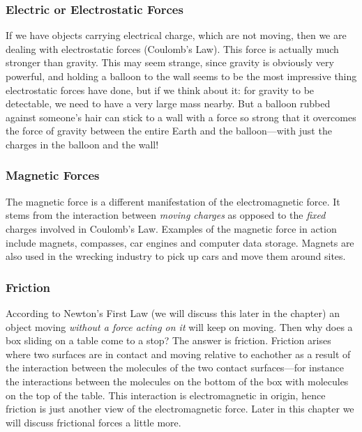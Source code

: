 \subsubsection{Electric or Electrostatic Forces}
If we have objects carrying electrical charge, which are not moving, then we are dealing with electrostatic forces (Coulomb's Law). This force is actually much stronger than gravity. This may seem strange, since gravity is obviously very powerful, and holding a balloon to the wall seems to be the most impressive thing electrostatic forces have done, but if we think about it: for gravity to be detectable, we need to have a very large mass nearby. But a balloon rubbed against someone's hair can stick to a wall with a force so strong that it overcomes the force of gravity between the entire Earth and the balloon---with just the charges in the balloon and the wall!

\subsubsection{Magnetic Forces}
The magnetic force is a different manifestation of the electromagnetic force. It stems from the interaction between \emph{moving charges} as opposed to the \emph{fixed} charges involved in Coulomb's Law. Examples of the magnetic force in action include magnets, compasses, car engines and computer data storage. Magnets are also used in the wrecking industry to pick up cars and move them around sites.

\subsubsection{Friction}
According to Newton's First Law (we will discuss this later in the chapter) an object moving \emph{without a force acting on it} will keep on moving. Then why does a box sliding on a table come to a stop? The answer is friction. Friction arises where two surfaces are in contact and moving relative to eachother as a result of the interaction between the molecules of the two contact surfaces---for instance the interactions between the molecules on the bottom of the box with molecules on the top of the table. This interaction is electromagnetic in origin, hence friction is just another view of the electromagnetic force. Later in this chapter we will discuss frictional forces a little more.

